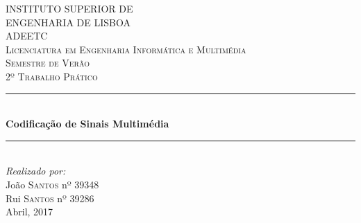 \documentclass[12pt,a4paper]{article}
\begin{document}
\begin{titlepage}

\newcommand{\HRule}{\rule{\linewidth}{0.5mm}} %

\center %
 

\textsc{\LARGE INSTITUTO SUPERIOR DE \\[0.2cm] ENGENHARIA DE LISBOA}\\[0.5cm]
\textsc{\LARGE ADEETC  }\\[0.3cm]
\textsc{\Large Licenciatura em Engenharia Informática e Multimédia }\\[0.3cm]
\textsc{\Large Semestre de Verão}\\[0.5cm]
\textsc{\Large 2º Trabalho Prático}\\[0.5cm]


\HRule \\[0.4cm]
{ \huge \bfseries Codificação de Sinais Multimédia}\\[0.03cm] %
\HRule \\[1.5cm]

\Large \emph{Realizado por:}\\
João \textsc{Santos} nº 39348\\ 
Rui \textsc{Santos} nº 39286\\[2cm] 

{\large Abril, 2017}\\[1cm]



\end{titlepage}
\end{document}
